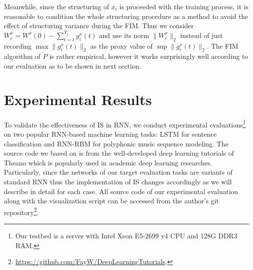 \documentclass[twoside,leqno,twocolumn]{article}
\begin{document}
Meanwhile, since the structuring of $x_i$ is proceeded with the training process, it is reasonable to condition the whole structuring procedure as a method to avoid the effect of structuring variance during the FIM. Thus we consider $W^x_i=W^x(0)-\sum_{t=1}^{T_i}g_i^x(t)$ and use its norm $\|W_i^x\|_2$ instead of just recording $\max \|g_i^x(t)\|_2$ as the proxy value of $\sup\|g_i^x(t)\|_2$. The FIM algorithm of $P$ is rather empirical, however it works surprisingly well according to our evaluation as to be shown in next section.
\section{Experimental Results}
To validate the effectiveness of IS in RNN, we conduct experimental evaluations\footnote{Our testbed is a server with Intel Xeon E5-2699 v4 CPU and 128G DDR3 RAM.} on two popular RNN-based machine learning tasks: LSTM for sentence classification and RNN-RBM for polyphonic music sequence modeling. The source code we based on is from the well-developed deep learning tutorials of Theano\cite{bergstra2010theano} which is popularly used in academic deep learning researches. Particularly, since the networks of our target evaluation tasks are variants of standard RNN thus the implementation of IS changes accordingly as we will describe in detail for each case. All source code of our experimental evaluation along with the visualization script can be accessed from the author's git repository\footnote{\url{https://github.com/FayW/DeepLearningTutorials}.}.
\end{document}

